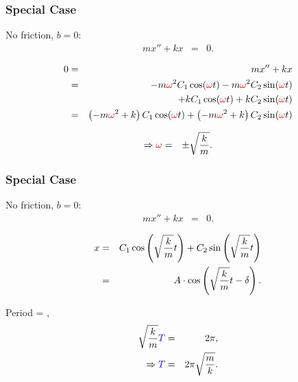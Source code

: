 \begin{frame}
  \frametitle{Special Case}

  No friction, $b=0$:
  \begin{eqnarray*}
    m x'' + kx & = & 0.
  \end{eqnarray*}

  {
    \begin{eqnarray*}
      0 & = & mx''+kx \\
        & = & - m{\color{red}\omega}^2 C_1 \cos({\color{red}\omega} t) - m{\color{red}\omega}^2 C_2 \sin({\color{red}\omega} t) \\
        &   & + k C_1 \cos({\color{red}\omega} t) + k C_2 \sin({\color{red}\omega} t)\\
        & = & \left( -m {\color{red}\omega}^2 + k \right) C_1 \cos({\color{red}\omega} t) +
              \left( -m {\color{red}\omega}^2 + k \right) C_2 \sin({\color{red}\omega} t)
    \end{eqnarray*}
  }

  {
    \begin{eqnarray*}
      \Rightarrow {\color{red}\omega} & = & \pm \sqrt{\frac{k}{m}}.
    \end{eqnarray*}
  }

  \vfill

\end{frame}


\begin{frame}
  \frametitle{Special Case}

  No friction, $b=0$:
  \begin{eqnarray*}
    m x'' + kx & = & 0.
  \end{eqnarray*}

  \begin{eqnarray*}
    x & = & C_1 \cos\left(\sqrt{\frac{k}{m}} t\right) +
    C_2 \sin\left(\sqrt{\frac{k}{m}} t\right) \\
    & = & A \cdot \cos\left( \sqrt{\frac{k}{m}} t - \delta \right).
  \end{eqnarray*}

  Period = ,
  \begin{eqnarray*}
    \sqrt{\frac{k}{m}} {\color{blue}T} & = & 2\pi, \\
    \Rightarrow {\color{blue}T} & = & 2 \pi \sqrt{\frac{m}{k}}.
  \end{eqnarray*}

\end{frame}



